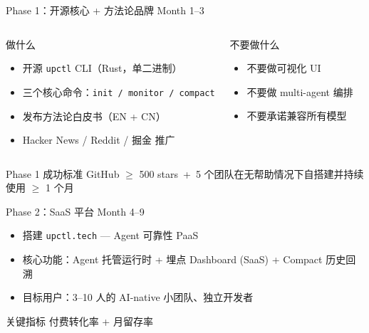 \documentclass[12pt,aspectratio=169,utf8]{beamer}
\begin{document}
\begin{frame}{Phase 1：开源核心 + 方法论品牌 \hfill Month 1--3}
  \begin{columns}[T]
    \footnotesize
    \begin{block}{做什么}
      \begin{itemize}
        \item 开源 \texttt{upctl} CLI（Rust，单二进制）
        \item 三个核心命令：\texttt{init / monitor / compact}
        \item 发布方法论白皮书（EN + CN）
        \item Hacker News / Reddit / 掘金 推广
      \end{itemize}
    \end{block}

    \footnotesize
    \begin{block}{不要做什么}
      \begin{itemize}
        \item 不要做可视化 UI
        \item 不要做 multi-agent 编排
        \item 不要承诺兼容所有模型
      \end{itemize}
    \end{block}
  \end{columns}

  \vspace{6pt}
  \begin{alertblock}{Phase 1 成功标准}
    \small GitHub $\ge$ 500 stars~+~5 个团队在无帮助情况下自搭建并持续使用 $\ge$ 1 个月
  \end{alertblock}
\end{frame}

\begin{frame}{Phase 2：SaaS 平台 \hfill Month 4--9}
  \begin{itemize}
    \item 搭建 \texttt{upctl.tech} — Agent 可靠性 PaaS
    \item 核心功能：Agent 托管运行时 + 埋点 Dashboard (SaaS) + Compact 历史回溯
    \item 目标用户：3--10 人的 AI-native 小团队、独立开发者
  \end{itemize}

  \vspace{8pt}
  \begin{block}{关键指标}
    \centering 付费转化率 \quad + \quad 月留存率
  \end{block}
\end{frame}
\end{document}
